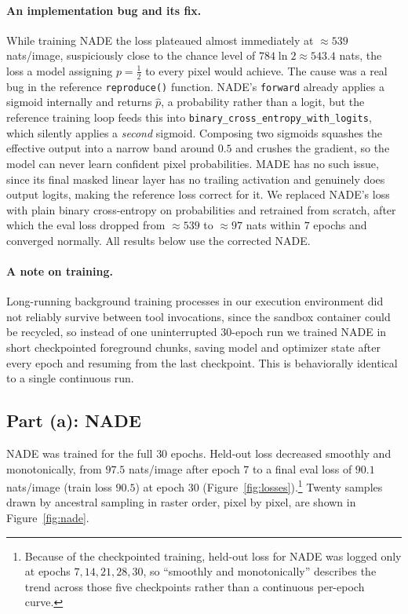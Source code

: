 \documentclass[11pt]{article}
\begin{document}
\paragraph{An implementation bug and its fix.} While training NADE the loss
plateaued almost immediately at $\approx 539$ nats/image, suspiciously close to
the chance level of $784\ln 2 \approx 543.4$ nats, the loss a model assigning
$p=\tfrac12$ to every pixel would achieve. The cause was a real bug in the
reference \texttt{reproduce()} function. NADE's \texttt{forward} already applies
a sigmoid internally and returns $\hat p$, a probability rather than a logit,
but the reference training loop feeds this into
\texttt{binary\_cross\_entropy\_with\_logits}, which silently applies a
\emph{second} sigmoid. Composing two sigmoids squashes the effective output into
a narrow band around $0.5$ and crushes the gradient, so the model can never
learn confident pixel probabilities. MADE has no such issue, since its final
masked linear layer has no trailing activation and genuinely does output
logits, making the reference loss correct for it. We replaced NADE's loss with
plain binary cross-entropy on probabilities and retrained from scratch, after
which the eval loss dropped from $\approx 539$ to $\approx 97$ nats within $7$
epochs and converged normally. All results below use the corrected NADE.

\paragraph{A note on training.} Long-running background training processes in
our execution environment did not reliably survive between tool invocations,
since the sandbox container could be recycled, so instead of one uninterrupted
30-epoch run we trained NADE in short checkpointed foreground chunks, saving
model and optimizer state after every epoch and resuming from the last
checkpoint. This is behaviorally identical to a single continuous run.

\subsection*{Part (a): NADE}

NADE was trained for the full $30$ epochs. Held-out loss decreased smoothly and
monotonically, from $97.5$ nats/image after epoch $7$ to a final eval loss of
$90.1$ nats/image (train loss $90.5$) at epoch $30$
(Figure~\ref{fig:losses}).\footnote{Because of the checkpointed training,
held-out loss for NADE was logged only at epochs $7, 14, 21, 28, 30$, so
``smoothly and monotonically'' describes the trend across those five
checkpoints rather than a continuous per-epoch curve.} Twenty samples drawn by
ancestral sampling in raster order, pixel by pixel, are shown in
Figure~\ref{fig:nade}.
\end{document}
